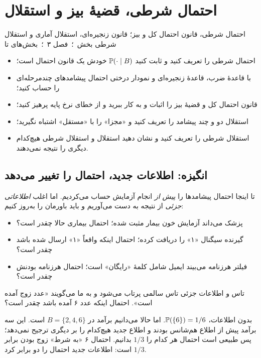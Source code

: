 \chapter{احتمال شرطی، قضیهٔ بیز و استقلال}
\label{ch:s4}

{احتمال شرطی، قانون احتمال کل و بیز؛ قانون زنجیره‌ای، استقلال آماری و استقلال شرطی}
{ بخش  \,؛\,  فصل ۳ \,؛\,  بخش‌های  تا }
{\begin{itemize}
  \item احتمال شرطی را تعریف کنید و ثابت کنید $\P(\cdot\mid B)$ خودش یک قانون احتمال است؛
  \item با قاعدهٔ ضرب، قاعدهٔ زنجیره‌ای و نمودار درختی احتمال پیشامدهای چندمرحله‌ای را حساب کنید؛
  \item قانون احتمال کل و قضیهٔ بیز را اثبات و به کار ببرید و از خطای نرخ پایه پرهیز کنید؛
  \item استقلال دو و چند پیشامد را تعریف کنید و «مجزا» را با «مستقل» اشتباه نگیرید؛
  \item استقلال شرطی را تعریف کنید و نشان دهید استقلال و استقلال شرطی هیچ‌کدام دیگری را نتیجه نمی‌دهند.
\end{itemize}}

\section{انگیزه: اطلاعات جدید، احتمال را تغییر می‌دهد}

تا اینجا احتمال پیشامدها را \emph{پیش از} انجام آزمایش حساب می‌کردیم. اما اغلب \emph{اطلاعاتی جزئی} از نتیجه به دست می‌آوریم و باید باورمان را به‌روز کنیم:
\begin{itemize}
  \item پزشک می‌داند آزمایش خون بیمار مثبت شده؛ احتمال بیماری حالا چقدر است؟
  \item گیرنده سیگنال «۱» را دریافت کرده؛ احتمال اینکه واقعاً «۱» ارسال شده باشد چقدر است؟
  \item فیلتر هرزنامه می‌بیند ایمیل شامل کلمهٔ «رایگان» است؛ احتمال هرزنامه بودنش چقدر است؟
\end{itemize}

\begin{example}{تاس و اطلاعات جزئی}
تاس سالمی پرتاب می‌شود و به ما می‌گویند «عدد زوج آمده است». احتمال اینکه عدد ۶ آمده باشد چقدر است؟
\begin{solution}
بدون اطلاعات، $\P(\{6\})=1/6$. اما حالا می‌دانیم برآمد در $B=\{2,4,6\}$ است. این سه برآمد پیش از اطلاع هم‌شانس بودند و اطلاع جدید هیچ‌کدام را بر دیگری ترجیح نمی‌دهد؛ پس طبیعی است احتمال هر کدام را $1/3$ بدانیم. احتمال ۶ «به شرط» زوج بودن برابر $1/3$ است: اطلاعات جدید احتمال را دو برابر کرد.
\end{solution}
\end{example}


